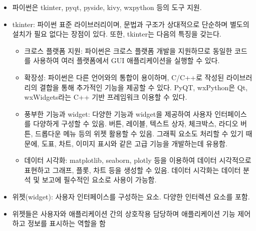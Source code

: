 \begin{itemize}
\tightlist
\item
  파이썬은 tkinter, pyqt, pyside, kivy, wxpython 등의 도구 지원.
\item
  tkinter: 파이썬 표준 라이브러리이며, 문법과 구조가 상대적으로 단순하며
  별도의 설치가 필요 없다는 장점이 있다. 또한, tkinter는 다음의 특징을
  갖는다.

  \begin{itemize}
  \tightlist
  \item
    크로스 플랫폼 지원: 파이썬은 크로스 플랫폼 개발을 지원하므로 동일한
    코드를 사용하여 여러 플랫폼에서 GUI 애플리케이션을 실행할 수 있다.
  \item
    확장성: 파이썬은 다른 언어와의 통합이 용이하며, C/C++로 작성된
    라이브러리의 결합을 통해 추가적인 기능을 제공할 수 있다. PyQT,
    wxPython은 Qt, wxWidgets라는 C++ 기반 프레임워크 이용할 수 있다.
  \item
    풍부한 기능과 widget: 다양한 기능과 widget을 제공하여 사용자
    인터페이스를 다양하게 구성할 수 있음. 버튼, 레이블, 텍스트 상자,
    체크박스, 라디오 버튼, 드롭다운 메뉴 등의 위젯 활용할 수 있음.
    그래픽 요소도 처리할 수 있기 때문에, 도표, 차트, 이미지 표시와 같은
    고급 기능을 개발하는데 유용함.
  \item
    데이터 시각화: matplotlib, seaborn, plotly 등을 이용하여 데이터
    시각적으로 표현하고 그래프, 플롯, 차트 등을 생성할 수 있음. 데이터
    시각화는 데이터 분석 및 보고에 필수적인 요소로 사용이 가능함.
  \end{itemize}
\item
  위젯(widget): 사용자 인터페이스를 구성하는 요소. 다양한 인터렉션
  요소를 포함.
\item
  위젯들은 사용자와 애플리케이션 간의 상호작용 담당하며 애플리케이션
  기능 제어하고 정보를 표시하는 역할을 함


\end{itemize}

